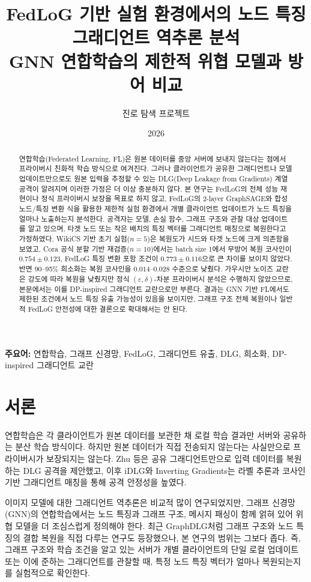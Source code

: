 \documentclass[10pt,twocolumn]{article}
\title{\textbf{FedLoG 기반 실험 환경에서의 노드 특징 그래디언트 역추론 분석}\\
\large GNN 연합학습의 제한적 위협 모델과 방어 비교}
\author{진로 탐색 프로젝트}
\date{2026}
\begin{document}
\maketitle

\begin{abstract}
연합학습(Federated Learning, FL)은 원본 데이터를 중앙 서버에 보내지 않는다는 점에서 프라이버시 친화적 학습 방식으로 여겨진다. 그러나 클라이언트가 공유한 그래디언트나 모델 업데이트만으로도 원본 입력을 추정할 수 있는 DLG(Deep Leakage from Gradients) 계열 공격이 알려지며 이러한 가정은 더 이상 충분하지 않다. 본 연구는 FedLoG\cite{kim2025fedlog}의 전체 성능 재현이나 정식 프라이버시 보장을 목표로 하지 않고, FedLoG의 2-layer GraphSAGE와 합성 노드/특징 변환 식을 활용한 제한적 실험 환경에서 개별 클라이언트 업데이트가 노드 특징을 얼마나 노출하는지 분석한다. 공격자는 모델, 손실 함수, 그래프 구조와 관찰 대상 업데이트를 알고 있으며, 타겟 노드 또는 작은 배치의 특징 벡터를 그래디언트 매칭으로 복원한다고 가정하였다. WikiCS 기반 초기 실험($n=5$)은 복원도가 시드와 타겟 노드에 크게 의존함을 보였고, Cora 공식 분할 기반 재검증($n=10$)에서는 batch size 1에서 무방어 복원 코사인이 $0.754 \pm 0.123$, FedLoG 특징 변환 포함 조건이 $0.773 \pm 0.116$으로 큰 차이를 보이지 않았다. 반면 90--95\% 희소화는 복원 코사인을 $0.014$--$0.028$ 수준으로 낮췄다. 가우시안 노이즈 교란은 강도에 따라 복원을 낮췄지만 정식 $(\varepsilon,\delta)$-차분 프라이버시 분석은 수행하지 않았으므로, 본문에서는 이를 DP-inspired 그래디언트 교란으로만 부른다. 결과는 GNN 기반 FL에서도 제한된 조건에서 노드 특징 유출 가능성이 있음을 보이지만, 그래프 구조 전체 복원이나 일반적 FedLoG 안전성에 대한 결론으로 확대해서는 안 된다.
\end{abstract}

\noindent\textbf{주요어:} 연합학습, 그래프 신경망, FedLoG, 그래디언트 유출, DLG, 희소화, DP-inspired 그래디언트 교란

\section{서론}
연합학습은 각 클라이언트가 원본 데이터를 보관한 채 로컬 학습 결과만 서버와 공유하는 분산 학습 방식이다. 하지만 원본 데이터가 직접 전송되지 않는다는 사실만으로 프라이버시가 보장되지는 않는다. Zhu 등\cite{zhu2019dlg}은 공유 그래디언트만으로 입력 데이터를 복원하는 DLG 공격을 제안했고, 이후 iDLG\cite{zhao2020idlg}와 Inverting Gradients\cite{geiping2020inverting}는 라벨 추론과 코사인 기반 그래디언트 매칭을 통해 공격 안정성을 높였다.

이미지 모델에 대한 그래디언트 역추론은 비교적 많이 연구되었지만, 그래프 신경망(GNN)의 연합학습에서는 노드 특징과 그래프 구조, 메시지 패싱이 함께 얽혀 있어 위협 모델을 더 조심스럽게 정의해야 한다. 최근 GraphDLG\cite{wei2026graphdlg}처럼 그래프 구조와 노드 특징의 결합 복원을 직접 다루는 연구도 등장했으나, 본 연구의 범위는 그보다 좁다. 즉, 그래프 구조와 학습 조건을 알고 있는 서버가 개별 클라이언트의 단일 로컬 업데이트 또는 이에 준하는 그래디언트를 관찰할 때, 특정 노드 특징 벡터가 얼마나 복원되는지를 실험적으로 확인한다.
\end{document}
